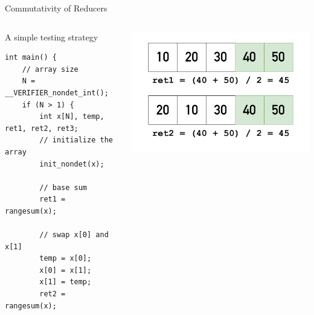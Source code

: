 \documentclass[aspectratio=1610,10.5pt]{beamer} %
\begin{document}
\begin{frame}[fragile]{Commutativity of Reducers}
    \begin{columns}
        \begin{column}{0.45\textwidth}
            \begin{block}{A simple testing strategy}
                    \begin{verbatim}
int main() {
    // array size
    N = __VERIFIER_nondet_int();
    if (N > 1) {
        int x[N], temp, ret1, ret2, ret3;
        // initialize the array
        init_nondet(x);

        // base sum
        ret1 = rangesum(x);

        // swap x[0] and x[1]
        temp = x[0];
        x[0] = x[1];
        x[1] = temp;
        ret2 = rangesum(x);
                    \end{verbatim}
            \end{block}
        \end{column}
        \begin{column}{0.55\textwidth}
            \includegraphics[height=%
            0.55\textheight]{../res/rangesum-ret1-2}
        \end{column}
    \end{columns}
\end{frame}
\end{document}
